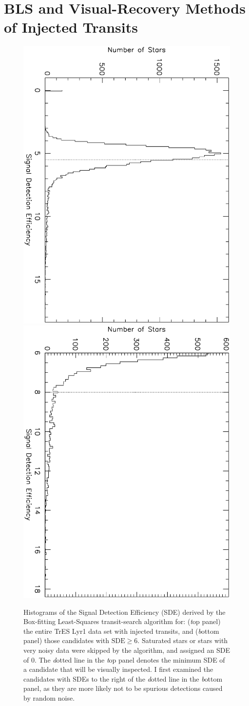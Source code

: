 \section{BLS and Visual-Recovery Methods of Injected Transits}\label{cha:human:sec:rec}

\begin{figure}
\begin{center}
\centering
\includegraphics[width=.55\textwidth, angle=90]{7_sde_a}\\
\includegraphics[width=.55\textwidth, angle=90]{7_sde_b}\\
\caption[Histograms of BLS SDEs for fake data set]{%
Histograms of the Signal Detection Efficiency (SDE) derived by the Box-fitting Least-Squares transit-search algorithm for: %
({\textit top panel}) the entire TrES Lyr1 data set with injected transits, and %
({\textit bottom panel}) those candidates with $\mathrm{SDE}\geq6$.
Saturated stars or stars with very noisy data were skipped by the algorithm, and assigned an SDE of 0.
The {\textit dotted} line in the {\textit top panel} denotes the minimum SDE of a candidate that will be visually inspected.
I first examined the candidates with SDEs to the right of the {\textit dotted} line in the {\textit bottom panel}, as they are more likely not to be spurious detections caused by random noise.
}\label{cha:human:sec:model:fig:sde}
\end{center}
\end{figure}


